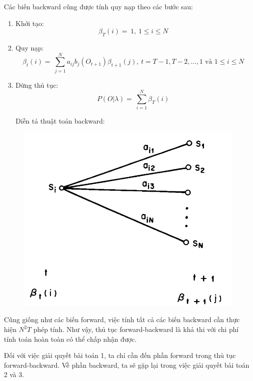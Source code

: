 \documentclass[13pt]{extreport}
\begin{document}
Các biến backward cũng được tính quy nạp theo các bước sau: \par
\begin{enumerate}
\item Khởi tạo: 
$$  \beta _{T} \left( i \right) =~1,~1 \leq i \leq N $$
\item Quy nạp:
\begin{equation}
\beta _{t} \left( i \right) =~ \sum _{j=1}^{N} a_{ij} b_j \left(O_{t+1} \right) \beta _{t+1} (j),~t=T-1,T-2,...,1 \textrm{ và } 1 \leq i \leq N
\end{equation}
\item Dừng thủ tục: 
$$ P \left( O \vert  \lambda  \right) =~ \sum _{i=1}^{N} \beta _{T} \left( i \right)  $$

Diễn tả thuật toán backward:  \par
\end{enumerate}

\begin{figure}[H]
\begin{center}
\includegraphics[scale=0.5]{./uploads_new/Hidden_Markov_Model_1._Mo_hinh_Markov_Vi.docx_DIR/media/Fig5.PNG}
\end{center}
\end{figure}


Cũng giống như các biến forward, việc tính tất cả các biến backward cần thực hiện $N^2T$ phép tính. Như vậy, thủ tục forward-backward là khả thi với chi phí tính toán hoàn toàn có thể chấp nhận được.  \par
Đối với việc giải quyết bài toán 1, ta chỉ cần đến phần forward trong thủ tục forward-backward. Về phần backward, ta sẽ gặp lại trong việc giải quyết bài toán 2 và 3. \par
\end{document}
